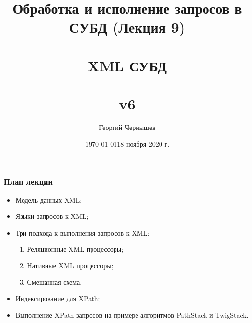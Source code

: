 \documentclass{beamer}
\title[Обработка и исполнение запросов: лекция 9]{Обработка и исполнение запросов в СУБД (Лекция 9) \\~\\ XML СУБД\\~\\ v6} %
\author{Георгий Чернышев} %
\institute[ВШЭ] %
{
Высшая Школа Экономики \\ %
\medskip
\textit{chernishev@gmail.com} %
}
\date{\today} %
\date{18 ноября 2020 г.}
\begin{document}
\begin{frame}
\titlepage %
\end{frame}

\begin{frame}
\frametitle{План лекции}

\begin{itemize}
  \setlength\itemsep{1em}
  \item Модель данных XML;
  \item Языки запросов к XML;
  \item Три подхода к выполнения запросов к XML: 
  \begin{enumerate}
    \item Реляционные XML процессоры;
    \item Нативные XML процессоры;
    \item Смешанная схема.
  \end{enumerate}
  \item Индексирование для XPath;
  \item Выполнение XPath запросов на примере алгоритмов PathStack и TwigStack.
\end{itemize}
\end{frame}
\end{document}
